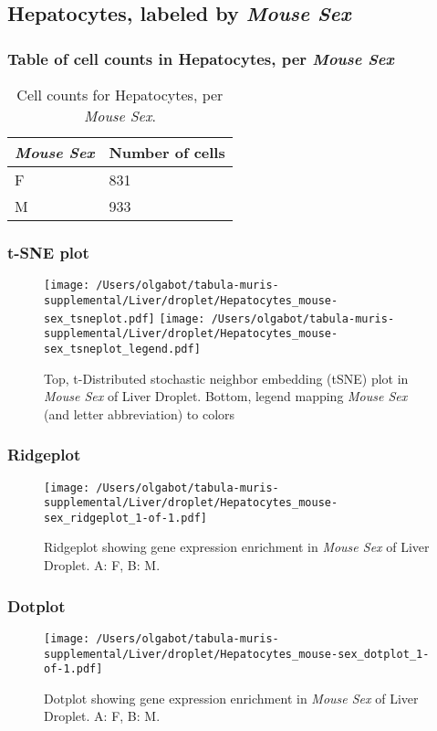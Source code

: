 \clearpage

\subsection{Hepatocytes, labeled by \emph{Mouse Sex}}
\subsubsection{Table of cell counts in Hepatocytes, per \emph{Mouse Sex}}\begin{table}[h]
\centering
\label{my-label}
\begin{tabular}{@{}ll@{}}
\toprule

\emph{Mouse Sex}& Number of cells \\ \midrule
F & 831 \\

M & 933 \\
\bottomrule
\end{tabular}
\caption{Cell counts for Hepatocytes, per \emph{Mouse Sex}.}
\end{table}

\clearpage
\subsubsection{t-SNE plot}
\begin{figure}[h]
\centering
\texttt{[image: /Users/olgabot/tabula-muris-supplemental/Liver/droplet/Hepatocytes\_mouse-sex\_tsneplot.pdf]}
\texttt{[image: /Users/olgabot/tabula-muris-supplemental/Liver/droplet/Hepatocytes\_mouse-sex\_tsneplot\_legend.pdf]}
\caption{Top, t-Distributed stochastic neighbor embedding (tSNE) plot  in \emph{Mouse Sex} of Liver Droplet. Bottom, legend mapping \emph{Mouse Sex} (and letter abbreviation) to colors}
\end{figure}


\clearpage

\subsubsection{Ridgeplot}
\begin{figure}[h]
\centering
\texttt{[image: /Users/olgabot/tabula-muris-supplemental/Liver/droplet/Hepatocytes\_mouse-sex\_ridgeplot\_1-of-1.pdf]}

\caption{ Ridgeplot  showing gene expression enrichment in \emph{Mouse Sex} of Liver Droplet. A: F, B: M.}
\end{figure}


\clearpage

\subsubsection{Dotplot}
\begin{figure}[h]
\centering
\texttt{[image: /Users/olgabot/tabula-muris-supplemental/Liver/droplet/Hepatocytes\_mouse-sex\_dotplot\_1-of-1.pdf]}

\caption{ Dotplot  showing gene expression enrichment in \emph{Mouse Sex} of Liver Droplet. A: F, B: M.}
\end{figure}

